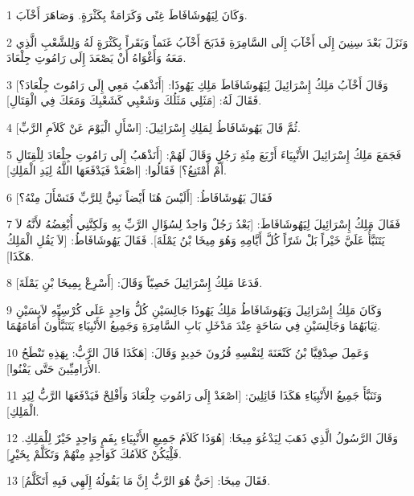 \par 1 وَكَانَ لِيَهُوشَافَاطَ غِنًى وَكَرَامَةٌ بِكَثْرَةٍ. وَصَاهَرَ أَخْآبَ.
\par 2 وَنَزَلَ بَعْدَ سِنِينَ إِلَى أَخْآبَ إِلَى السَّامِرَةِ فَذَبَحَ أَخْآبُ غَنَماً وَبَقَراً بِكَثْرَةٍ لَهُ وَلِلشَّعْبِ الَّذِي مَعَهُ وَأَغْوَاهُ أَنْ يَصْعَدَ إِلَى رَامُوتِ جِلْعَادَ.
\par 3 وَقَالَ أَخْآبُ مَلِكُ إِسْرَائِيلَ لِيَهُوشَافَاطَ مَلِكِ يَهُوذَا: [أَتَذْهَبُ مَعِي إِلَى رَامُوتَ جِلْعَادَ؟] فَقَالَ لَهُ: [مَثَلِي مَثَلُكَ وَشَعْبِي كَشَعْبِكَ وَمَعَكَ فِي الْقِتَالِ].
\par 4 ثُمَّ قَالَ يَهُوشَافَاطُ لِمَلِكِ إِسْرَائِيلَ: [اسْأَلِ الْيَوْمَ عَنْ كَلاَمِ الرَّبِّ].
\par 5 فَجَمَعَ مَلِكُ إِسْرَائِيلَ الأَنْبِيَاءَ أَرْبَعَ مِئَةِ رَجُلٍ وَقَالَ لَهُمْ: [أَنَذْهَبُ إِلَى رَامُوتِ جِلْعَادَ لِلْقِتَالِ أَمْ أَمْتَنِعُ؟] فَقَالُوا: [اصْعَدْ فَيَدْفَعَهَا اللَّهُ لِيَدِ الْمَلِكِ].
\par 6 فَقَالَ يَهُوشَافَاطُ: [أَلَيْسَ هُنَا أَيْضاً نَبِيٌّ لِلرَّبِّ فَنَسْأَلَ مِنْهُ؟]
\par 7 فَقَالَ مَلِكُ إِسْرَائِيلَ لِيَهُوشَافَاطَ: [بَعْدُ رَجُلٌ وَاحِدٌ لِسُؤَالِ الرَّبِّ بِهِ وَلَكِنَّنِي أُبْغِضُهُ لأَنَّهُ لاَ يَتَنَبَّأُ عَلَيَّ خَيْراً بَلْ شَرّاً كُلَّ أَيَّامِهِ وَهُوَ مِيخَا بْنُ يَمْلَةَ]. فَقَالَ يَهُوشَافَاطُ: [لاَ يَقُلِ الْمَلِكُ هَكَذَا].
\par 8 فَدَعَا مَلِكُ إِسْرَائِيلَ خَصِيّاً وَقَالَ: [أَسْرِعْ بِمِيخَا بْنِ يَمْلَةَ].
\par 9 وَكَانَ مَلِكُ إِسْرَائِيلَ وَيَهُوشَافَاطُ مَلِكُ يَهُوذَا جَالِسَيْنِ كُلُّ وَاحِدٍ عَلَى كُرْسِيِّهِ لاَبِسَيْنِ ثِيَابَهُمَا وَجَالِسَيْنِ فِي سَاحَةٍ عِنْدَ مَدْخَلِ بَابِ السَّامِرَةِ وَجَمِيعُ الأَنْبِيَاءِ يَتَنَبَّأُونَ أَمَامَهُمَا.
\par 10 وَعَمِلَ صِدْقِيَّا بْنُ كَنْعَنَةَ لِنَفْسِهِ قُرُونَ حَدِيدٍ وَقَالَ: [هَكَذَا قَالَ الرَّبُّ: بِهَذِهِ تَنْطَحُ الأَرَامِيِّينَ حَتَّى يَفْنُوا].
\par 11 وَتَنَبَّأَ جَمِيعُ الأَنْبِيَاءِ هَكَذَا قَائِلِينَ: [اصْعَدْ إِلَى رَامُوتِ جِلْعَادَ وَأَفْلِحْ فَيَدْفَعَهَا الرَّبُّ لِيَدِ الْمَلِكِ].
\par 12 وَقَالَ الرَّسُولُ الَّذِي ذَهَبَ لِيَدْعُوَ مِيخَا: [هُوَذَا كَلاَمُ جَمِيعِ الأَنْبِيَاءِ بِفَمٍ وَاحِدٍ خَيْرٌ لِلْمَلِكِ. فَلِْيَكُنْ كَلاَمُكَ كَوَاحِدٍ مِنْهُمْ وَتَكَلَّمْ بِخَيْرٍ].
\par 13 فَقَالَ مِيخَا: [حَيٌّ هُوَ الرَّبُّ إِنَّ مَا يَقُولُهُ إِلَهِي فَبِهِ أَتَكَلَّمُ].
